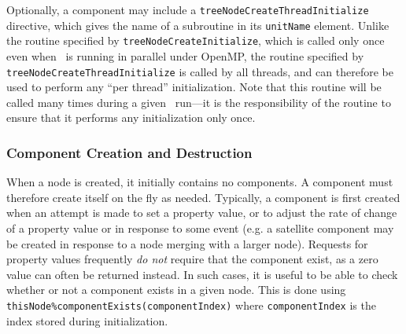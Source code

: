 Optionally, a component may include a {\tt treeNodeCreateThreadInitialize} directive, which gives the name of a subroutine in its {\tt unitName} element. Unlike the routine specified by {\tt treeNodeCreateInitialize}, which is called only once even when \glc\ is running in parallel under OpenMP, the routine specified by {\tt treeNodeCreateThreadInitialize} is called by all threads, and can therefore be used to perform any ``per thread'' initialization. Note that this routine will be called many times during a given \glc\ run---it is the responsibility of the routine to ensure that it performs any initialization only once.

\subsubsection{Component Creation and Destruction}

When a node is created, it initially contains no components. A component must therefore create itself on the fly as needed. Typically, a component is first created when an attempt is made to set a property value, or to adjust the rate of change of a property value or in response to some event (e.g. a satellite component may be created in response to a node merging with a larger node). Requests for property values frequently \emph{do not} require that the component exist, as a zero value can often be returned instead. In such cases, it is useful to be able to check whether or not a component exists in a given node. This is done using {\tt thisNode\%componentExists(componentIndex)} where {\tt componentIndex} is the index stored during initialization.

